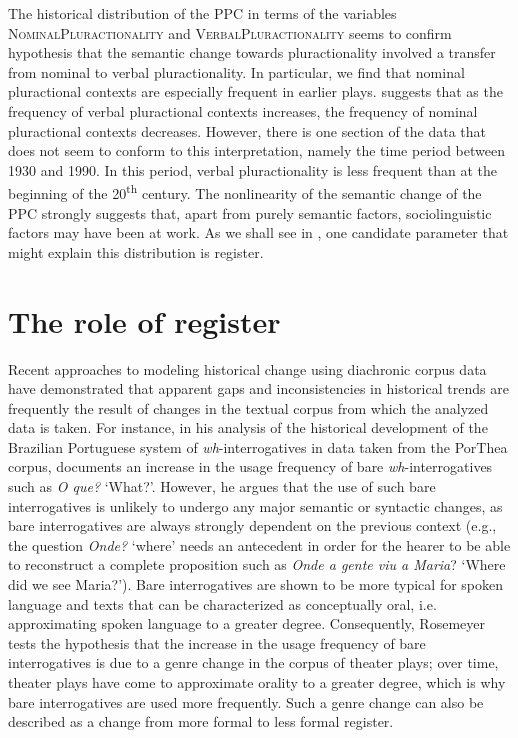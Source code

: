 \documentclass[output=paper,colorlinks,citecolor=brown]{langscibook}
\begin{document}
\begin{sloppypar}
The historical distribution of the PPC in terms of the variables \textsc{NominalPluractionality} and \textsc{VerbalPluractionality} seems to confirm   hypothesis that the semantic change towards pluractionality involved a transfer from nominal to verbal pluractionality. In particular, we find that nominal pluractional contexts are especially frequent in earlier plays.  suggests that as the frequency of verbal pluractional contexts increases, the frequency of nominal pluractional contexts decreases. However, there is one section of the data that does not seem to conform to this interpretation, namely the time period between 1930 and 1990. In this period, verbal pluractionality is less frequent than at the beginning of the 20\textsuperscript{th} century. The nonlinearity of the semantic change of the PPC strongly suggests that, apart from purely semantic factors, sociolinguistic factors may have been at work. As we shall see in , one candidate parameter that might explain this distribution is register.
\end{sloppypar}

\section{The role of register}\label{sec:rb6}

Recent approaches to modeling historical change using diachronic corpus data have demonstrated that apparent gaps and inconsistencies in historical trends are frequently the result of changes in the textual corpus from which the analyzed data is taken. For instance, in his analysis of the historical development of the Brazilian Portuguese system of \textit{wh}-interrogatives in data taken from the PorThea corpus, \citet{Rosemeyer2019a} documents an increase in the usage frequency of bare \textit{wh}-interrogatives such as \textit{O que?} ‘What?’. However, he argues that the use of such bare interrogatives is unlikely to undergo any major semantic or syntactic changes, as bare interrogatives are always strongly dependent on the previous context (e.g., the question \textit{Onde?} ‘where’ needs an antecedent in order for the hearer to be able to reconstruct a complete proposition such as \textit{Onde a gente viu a Maria}? ‘Where did we see Maria?’). Bare interrogatives are shown to be more typical for spoken language and texts that can be characterized as conceptually oral, i.e. approximating spoken language to a greater degree. Consequently, Rosemeyer tests the hypothesis that the increase in the usage frequency of bare interrogatives is due to a genre change in the corpus of theater plays; over time, theater plays have come to approximate orality to a greater degree, which is why bare interrogatives are used more frequently. Such a genre change can also be described as a change from more formal to less formal register. 
\end{document}
